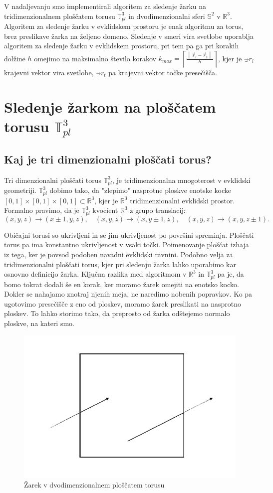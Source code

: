\documentclass[titlepage]{article}
\begin{document}
\bigskip
V nadaljevanju smo implementirali algoritem za sledenje žarku na tridimenzionalnem ploščatem torusu $\mathbb{T}_{pl}^{3}$ in dvodimenzionalni sferi $\mathbb{S}^2$ v $\mathbb{R}^3$. Algoritem za sledenje žarku v evklidskem prostoru je enak algoritmu za torus, brez preslikave žarka na željeno domeno. Sledenje v smeri vira svetlobe uporablja algoritem za sledenje žarku v evklidskem prostoru, pri tem pa ga pri korakih dolžine $h$ omejimo na maksimalno število korakov
$k_{max}= \left \lceil \frac{\left \|\vec{r}_{l}-\vec{r}_{t} \right \|}{h} \right \rceil$, kjer je $\vec_{r}_{l}$ krajevni vektor vira svetlobe,
$\vec_{r}_{t}$ pa krajevni vektor točke presečišča.

\section{Sledenje žarkom na ploščatem torusu $\mathbb{T}_{pl}^{3}$} 
\subsection{Kaj je tri dimenzionalni ploščati torus?}
Tri dimenzionalni ploščati torus \( \mathbb{T}^3_{pl} \), je tridimenzionalna mnogoterost v evklidski geometriji. \( \mathbb{T}^3_{pl} \) dobimo tako, da "zlepimo" nasprotne ploskve enotske kocke \([0,1] \times [0,1] \times [0,1] \subset \mathbb{R}^3 \), kjer je \(\mathbb{R}^3\) tridimenzionalni evklidski prostor. Formalno pravimo, da je \( \mathbb{T}^3_{pl} \) kvocient \(\mathbb{R}^3\) z grupo translacij:
\[
(x, y, z) \to (x \pm 1, y, z), \quad (x, y, z) \to (x, y \pm 1, z), \quad (x, y, z) \to (x, y, z \pm 1).
\]

Običajni torusi so ukrivljeni in se jim ukrivljenost po površini spreminja. Ploščati torus pa ima konstantno ukrivljenost v vsaki točki. Poimenovanje ploščat izhaja iz tega, ker je povsod podoben navadni evklidski ravnini. Podobno velja za tridimenzionalni ploščati torus, kjer pri sledenju žarka lahko uporabimo kar osnovno definicijo žarka. Ključna razlika med algoritmom v \( \mathbb{R}^3 \) in \( \mathbb{T}^3_{pl} \) pa je, da bomo tokrat dodali še en korak, ker moramo žarek omejiti na enotsko kocko. Dokler se nahajamo znotraj njenih meja, ne naredimo nobenih popravkov. Ko pa ugotovimo presečišče z eno od ploskev, moramo žarek preslikati na nasprotno ploskev. To lahko storimo tako, da preprosto od žarka odštejemo normalo ploskve, na kateri smo.

\begin{figure}[H]
    \centering
    \includegraphics[width=0.5\linewidth]{Images/flat_torus_zrcaljenje.png}
    \caption{Žarek v dvodimenzionalnem ploščatem torusu}
    \label{Slika:Žarek v dvodimenzionalnem ploščatem torusu}
\end{figure}
\end{document}
